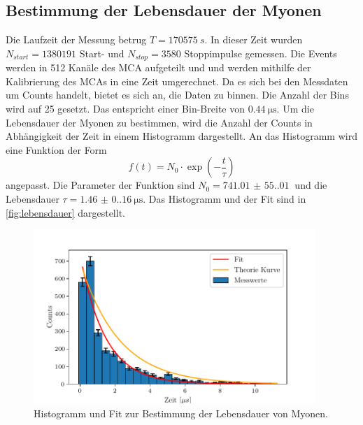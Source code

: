 \subsection{Bestimmung der Lebensdauer der Myonen}
Die Laufzeit der Messung betrug $T = \SI{170575}{s}$. In dieser Zeit wurden $N_{start} = 1380191$ Start- und $N_{stop} = 3580$ Stoppimpulse gemessen. Die Events werden in 512 Kanäle des MCA aufgeteilt und 
und werden mithilfe der Kalibrierung des MCAs in eine Zeit umgerechnet. Da es sich bei den Messdaten um Counts handelt, bietet es sich an, die Daten zu binnen. Die Anzahl der Bins wird auf 
25 gesetzt. Das entspricht einer Bin-Breite von $\SI{0.44}{\micro\s}$.
Um die Lebensdauer der Myonen zu bestimmen, wird die Anzahl der Counts in Abhängigkeit der Zeit in einem Histogramm dargestellt.
An das Histogramm wird eine Funktion der Form
\begin{equation*}
  f(t) = N_0 \cdot \exp(-\frac{t}{\tau})
\end{equation*}
angepasst. Die Parameter der Funktion sind $N_0 = \SI{741.01(55.01)}{}$ und die Lebensdauer $\tau = \SI{1.46(0.16)}{\micro\s}$. Das Histogramm und der Fit sind in \autoref{fig:lebensdauer} dargestellt.

\begin{figure}[H]
  \centering
  \includegraphics[width=0.95\textwidth]{build/lifespan_hist.pdf}
  \caption{Histogramm und Fit zur Bestimmung der Lebensdauer von Myonen.}
  \label{fig:lebensdauer}
\end{figure}

\newpage